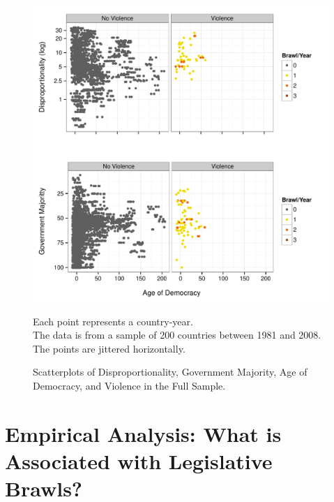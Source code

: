 \documentclass[a4paper]{article}\usepackage{graphicx, color}
\newenvironment{knitrout}{}{} %
\begin{document}
\begin{figure}[t]
    \caption{Scatterplots of Disproportionality, Government Majority, Age of Democracy, and Violence in the Full Sample.}  
    \label{framework_empirical}
    \begin{center}

\begin{knitrout}
\color{fgcolor}
\includegraphics[width=0.8\linewidth]{figure/FrameworkEmpirical} 

\end{knitrout}

    \end{center}
    \begin{singlespace}
        {\scriptsize{Each point represents a country-year. \\ The data is from a sample of 200 countries between 1981 and 2008. The points are jittered horizontally.}}
    \end{singlespace}

\end{figure}

\section{Empirical Analysis: What is Associated with Legislative Brawls?}
\end{document}
